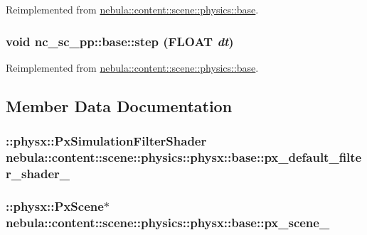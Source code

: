 Reimplemented from \hyperlink{classnebula_1_1content_1_1scene_1_1physics_1_1base_ab1d69f8e89776b5ff0963b08bfadcf15}{nebula::content::scene::physics::base}.\hypertarget{classnebula_1_1content_1_1scene_1_1physics_1_1physx_1_1base_a5b01976e1b4bf923019deca1bce6af2a}{
\subsubsection[{step}]{\setlength{\rightskip}{0pt plus 5cm}void nc\_\-sc\_\-pp::base::step (FLOAT {\em dt})}}
\label{classnebula_1_1content_1_1scene_1_1physics_1_1physx_1_1base_a5b01976e1b4bf923019deca1bce6af2a}


Reimplemented from \hyperlink{classnebula_1_1content_1_1scene_1_1physics_1_1base_a3557fe093b00ee05dcee7a3196900273}{nebula::content::scene::physics::base}.

\subsection{Member Data Documentation}
\hypertarget{classnebula_1_1content_1_1scene_1_1physics_1_1physx_1_1base_a414181f67b4979fe773c49aa6a71feb4}{
\subsubsection[{px\_\-default\_\-filter\_\-shader\_\-}]{\setlength{\rightskip}{0pt plus 5cm}::physx::PxSimulationFilterShader {\bf nebula::content::scene::physics::physx::base::px\_\-default\_\-filter\_\-shader\_\-}}}
\label{classnebula_1_1content_1_1scene_1_1physics_1_1physx_1_1base_a414181f67b4979fe773c49aa6a71feb4}
\hypertarget{classnebula_1_1content_1_1scene_1_1physics_1_1physx_1_1base_a54c9415d4951ca7702e6e29c3d5016bc}{
\subsubsection[{px\_\-scene\_\-}]{\setlength{\rightskip}{0pt plus 5cm}::physx::PxScene$\ast$ {\bf nebula::content::scene::physics::physx::base::px\_\-scene\_\-}}}
\label{classnebula_1_1content_1_1scene_1_1physics_1_1physx_1_1base_a54c9415d4951ca7702e6e29c3d5016bc}


